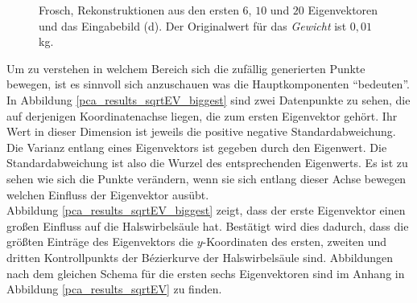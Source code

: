 \begin{figure}
  \caption{Frosch, Rekonstruktionen aus den ersten $6$, $10$ und $20$ Eigenvektoren und das Eingabebild (d). Der Originalwert für das \emph{Gewicht} ist $0{,}01$kg.}
  \label{frosch}
 \end{figure}
 
 
 Um zu verstehen in welchem Bereich sich die zufällig generierten Punkte bewegen, ist es sinnvoll sich anzuschauen was die Hauptkomponenten "`bedeuten"'. In Abbildung \ref{pca_results_sqrtEV_biggest} sind zwei Datenpunkte zu sehen, die auf derjenigen Koordinatenachse liegen, die zum ersten Eigenvektor gehört. Ihr Wert in dieser Dimension ist jeweils die positive \bzw negative Standardabweichung. Die Varianz entlang eines Eigenvektors ist gegeben durch den Eigenwert. Die Standardabweichung ist also die Wurzel des entsprechenden Eigenwerts. Es ist zu sehen wie sich die Punkte verändern, wenn sie sich entlang dieser Achse bewegen \bzw welchen Einfluss der Eigenvektor ausübt.\\
 Abbildung \ref{pca_results_sqrtEV_biggest} zeigt, dass der erste Eigenvektor einen großen Einfluss auf die Halswirbelsäule hat. Bestätigt wird dies dadurch, dass die größten Einträge des Eigenvektors die $y$-Koordinaten des ersten, zweiten und dritten Kontrollpunkts der Bézierkurve der Halswirbelsäule sind.
 Abbildungen nach dem gleichen Schema für die ersten sechs Eigenvektoren sind im Anhang in Abbildung \ref{pca_results_sqrtEV} zu finden.
 
